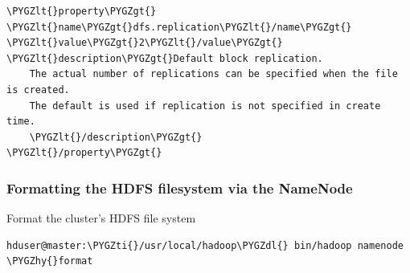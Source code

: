 \documentclass[letterpaper,10pt,english]{sphinxmanual}
\def\PYGZlt{\char`\<}
\def\PYGZgt{\char`\>}
\def\PYGZdl{\char`\$}
\def\PYGZhy{\char`\-}
\def\PYGZti{\char`\~}
\begin{document}
\begin{Verbatim}[commandchars=\\\{\}]
\PYGZlt{}property\PYGZgt{}
\PYGZlt{}name\PYGZgt{}dfs.replication\PYGZlt{}/name\PYGZgt{}
\PYGZlt{}value\PYGZgt{}2\PYGZlt{}/value\PYGZgt{}
\PYGZlt{}description\PYGZgt{}Default block replication.
    The actual number of replications can be specified when the file is created.
    The default is used if replication is not specified in create time.
    \PYGZlt{}/description\PYGZgt{}
\PYGZlt{}/property\PYGZgt{}
\end{Verbatim}
\begin{figure}[htbp]
\centering

\end{figure}


\subsubsection{Formatting the HDFS filesystem via the NameNode}
\label{hadoop:id9}
Format the cluster’s HDFS file system

\begin{Verbatim}[commandchars=\\\{\}]
hduser@master:\PYGZti{}/usr/local/hadoop\PYGZdl{} bin/hadoop namenode \PYGZhy{}format
\end{Verbatim}
\begin{figure}[htbp]
\centering

\end{figure}
\end{document}
